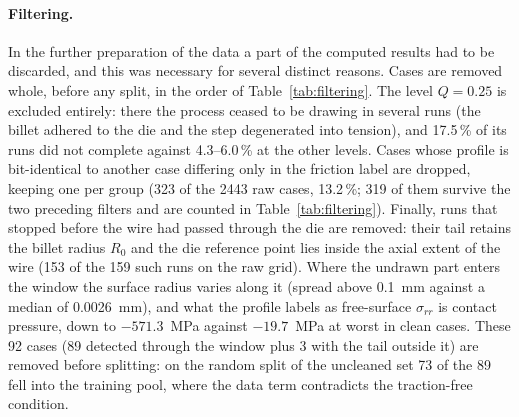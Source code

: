 \paragraph{Filtering.}
In the further preparation of the data a part of the computed results had to be discarded, and this was necessary for several distinct reasons. Cases are removed whole, before any split, in the order of Table~\ref{tab:filtering}. The level $Q=0.25$ is excluded entirely: there the process ceased to be drawing in several runs (the billet adhered to the die and the step degenerated into tension), and 17.5\,\% of its runs did not complete against 4.3--6.0\,\% at the other levels. %
Cases whose profile is bit-identical to another case differing only in the friction label are dropped, keeping one per group (323 of the 2443 raw cases, 13.2\,\%; 319 of them survive the two preceding filters and are counted in Table~\ref{tab:filtering}). %
Finally, runs that stopped before the wire had passed through the die are removed: their tail retains the billet radius $R_0$ and the die reference point lies inside the axial extent of the wire (153 of the 159 such runs on the raw grid). %
Where the undrawn part enters the window the surface radius varies along it (spread above 0.1~mm against a median of 0.0026~mm), and what the profile labels as free-surface $\sigma_{rr}$ is contact pressure, down to $-571.3$~MPa against $-19.7$~MPa at worst in clean cases. %
These 92 cases (89 detected through the window plus 3 with the tail outside it) are removed before splitting: on the random split of the uncleaned set 73 of the 89 fell into the training pool, where the data term contradicts the traction-free condition. %

